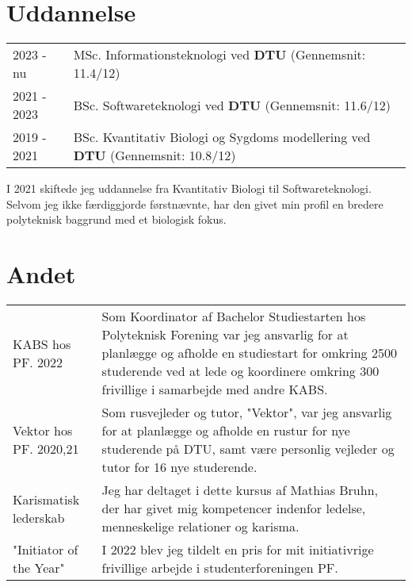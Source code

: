 \documentclass[a4paper,12pt]{article}
\begin{document}
\section{Uddannelse}
\begin{tabularx}{\linewidth}{@{}l X@{}}	
2023 - nu & MSc. Informationsteknologi ved \textbf{DTU} \hfill \normalsize (Gennemsnit: 11.4/12) \\

2021 - 2023 & BSc. Softwareteknologi ved \textbf{DTU} \hfill (Gennemsnit: 11.6/12) \\ 

2019 - 2021 & BSc. Kvantitativ Biologi og Sygdoms modellering ved \textbf{DTU} \hfill  (Gennemsnit: 10.8/12) \\
\end{tabularx}\vspace{5pt}
I 2021 skiftede jeg uddannelse fra Kvantitativ Biologi til Softwareteknologi. Selvom jeg ikke færdiggjorde førstnævnte, har den givet min profil en bredere polyteknisk baggrund med et biologisk fokus. 


\section{Andet}
\begin{tabularx}{\linewidth}{@{}l X@{}}
KABS hos PF. 2022 & \normalsize{Som Koordinator af Bachelor Studiestarten hos Polyteknisk Forening var jeg ansvarlig for at planlægge og afholde en studiestart for omkring 2500 studerende ved at lede og koordinere omkring 300 frivillige i samarbejde med andre KABS.}\\
Vektor hos PF. 2020,21  &  \normalsize{Som rusvejleder og tutor, "Vektor", var jeg ansvarlig for at planlægge og afholde en rustur for nye studerende på DTU, samt være personlig vejleder og tutor for 16 nye studerende. }\\  
Karismatisk lederskab & \normalsize{Jeg har deltaget i dette kursus af Mathias Bruhn, der har givet mig kompetencer indenfor ledelse, menneskelige relationer og karisma.}\\
"Initiator of the Year" & \normalsize{I 2022 blev jeg tildelt en pris for mit initiativrige frivillige arbejde i studenterforeningen PF. }
\end{tabularx}

\vfill
{}
\end{document}
